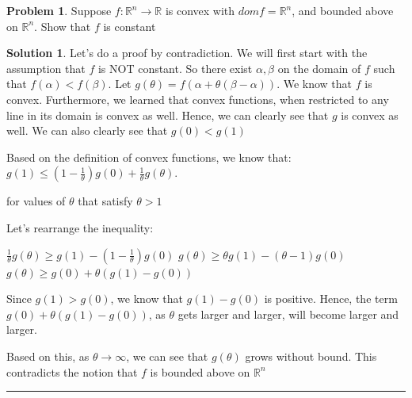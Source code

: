 \documentclass{article}
\theoremstyle{definition}
\newtheorem{problem}{Problem}
\def\fline{\rule{0.75\linewidth}{0.5pt}}
\newcommand{\finishline}{\begin{center}\fline\end{center}}
\newtheorem*{solution*}{Solution}
\newenvironment{solution}{\begin{solution*}}{{\finishline} \end{solution*}}
\begin{document}
\begin{problem}
    Suppose $f: \mathbb{R}^n \rightarrow \mathbb{R}$ is convex with $dom f = \mathbb{R}^n$, and bounded above on $\mathbb{R}^n$. Show that $f$ is constant

    \begin{solution}
        Let's do a proof by contradiction. We will first start with the assumption that $f$ is NOT constant. So there exist $\alpha, \beta$ on the domain of $f$ such that $f(\alpha) < f(\beta)$. Let $g(\theta) = f(\alpha + \theta(\beta - \alpha))$. We know that $f$ is convex. Furthermore, we learned that convex functions, when restricted to any line in its domain is convex as well. Hence, we can clearly see that $g$ is convex as well. We can also clearly see that $g(0) < g(1)$ \newline 

        Based on the definition of convex functions, we know that: \newline 
        $g(1) \leq (1 - \frac{1}{\theta}) g(0) + \frac{1}{\theta} g(\theta)$. 

        for values of $\theta$ that satisfy $\theta > 1$ \newline 

        Let's rearrange the inequality: \newline 

        $\frac{1}{\theta} g(\theta) \geq g(1) - (1 - \frac{1}{\theta}) g(0)$ \newline 
        $g(\theta) \geq \theta g(1) - (\theta - 1) g(0)$ \newline 
        $g(\theta) \geq g(0) + \theta (g(1) - g(0))$ \newline 


        Since $g(1) > g(0)$, we know that $g(1) - g(0)$ is positive. Hence, the term $g(0) + \theta (g(1) - g(0))$, as $\theta$ gets larger and larger, will become larger and larger. 

        Based on this, as $\theta \rightarrow \infty$, we can see that $g(\theta)$ grows without bound. This contradicts the notion that $f$ is bounded above on $\mathbb{R}^n$
        
        
    \end{solution}  
\end{problem}
\end{document}
